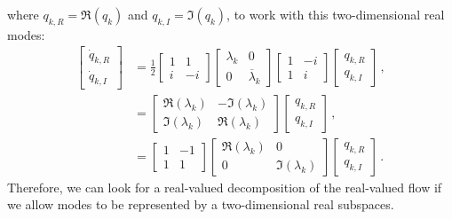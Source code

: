 \documentclass[10pt]{article}
\begin{document}
where $q_{k,R}=\Re(q_k)$ and $q_{k,I}=\Im(q_k)$,
to work with this two-dimensional real modes:
\begin{equation}
\begin{aligned}
    \left[
    \begin{matrix}{}
  \dot q_{k,R} \\
  \dot q_{k,I} 
  \end{matrix}
  \right]
  &=\frac{1}{2}
  \left[
  \begin{matrix}{}
  1 & 1 \\
  i & -i 
  \end{matrix}
\right]
\left[
  \begin{matrix}{}
  \lambda_k & 0 \\
  0 & \overline \lambda_k 
  \end{matrix}
\right]
\left[
  \begin{matrix}{}
  1 & -i \\
  1 & i 
  \end{matrix}
\right]
  \left[
  \begin{matrix}{}
  q_{k,R} \\
  q_{k,I} 
  \end{matrix}
\right]\,,\\
& = 
\left[
  \begin{matrix}{}
  \Re (\lambda_k) & -\Im (\lambda_k) \\
  \Im (\lambda_k) & \Re (\lambda_k) 
  \end{matrix}
\right]
  \left[
  \begin{matrix}{}
  q_{k,R} \\
  q_{k,I} 
  \end{matrix}
\right]\,,\\
& = 
\left[
  \begin{matrix}{}
  1 & -1 \\
  1 & 1 
  \end{matrix}
\right]
\left[
  \begin{matrix}
  \Re (\lambda_k) & 0 \\
  0 & \Im (\lambda_k) 
  \end{matrix}
\right]
  \left[
  \begin{matrix}{}
  q_{k,R} \\
  q_{k,I} 
  \end{matrix}
\right]\,.
\end{aligned}
\end{equation}
Therefore, we can look for a real-valued decomposition of the real-valued flow if we allow modes to be represented by a two-dimensional real subspaces.
\end{document}
